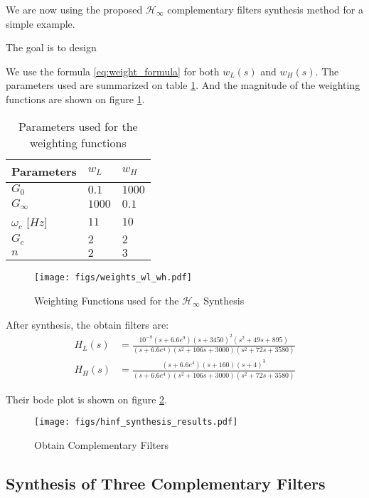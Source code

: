 \documentclass[9pt, technote, a4paper]{ieeeconf}
\begin{document}
We are now using the proposed \(\mathcal{H}_\infty\) complementary filters synthesis method for a simple example.

The goal is to design

We use the formula \eqref{eq:weight_formula} for both \(w_L(s)\) and \(w_H(s)\).
The parameters used are summarized on table \ref{tab:weights_params}. And the magnitude of the weighting functions are shown on figure \ref{fig:weights_wl_wh}.

\begin{table}[!htpb]
\caption{\label{tab:weights_params}
Parameters used for the weighting functions}
\centering
\begin{tabular}{|l|X|X|}
\hline
Parameters & \(w_L\) & \(w_H\)\\
\hline
\(G_0\) & \(0.1\) & \(1000\)\\
\hline
\(G_\infty\) & \(1000\) & \(0.1\)\\
\hline
\(\omega_c\) [\(\si{Hz}\)] & \(11\) & \(10\)\\
\hline
\(G_c\) & \(2\) & \(2\)\\
\hline
\(n\) & \(2\) & \(3\)\\
\hline
\end{tabular}
\end{table}


\begin{figure}[htbp]
\centering
\texttt{[image: figs/weights\_wl\_wh.pdf]}
\caption{\label{fig:weights_wl_wh}
Weighting Functions used for the \(\mathcal{H}_\infty\) Synthesis}
\end{figure}

After synthesis, the obtain filters are:
\begin{align}
  H_L(s) &= \frac{10^{-8} (s+6.6e^9) (s+3450)^2 (s^2 + 49s + 895)}{(s+6.6e^4) (s^2 + 106 s + 3000) (s^2 + 72s + 3580)}\\
  H_H(s) &= \frac{(s+6.6e^4) (s+160) (s+4)^3}{(s+6.6e^4) (s^2 + 106 s + 3000) (s^2 + 72s + 3580)}
\end{align}

Their bode plot is shown on figure \ref{fig:hinf_synthesis_results}.

\begin{figure}[htbp]
\centering
\texttt{[image: figs/hinf\_synthesis\_results.pdf]}
\caption{\label{fig:hinf_synthesis_results}
Obtain Complementary Filters}
\end{figure}

\subsection{Synthesis of Three Complementary Filters}
\label{sec:org415d7ce}
\label{sec:hinf_three_comp_filters}
\end{document}
